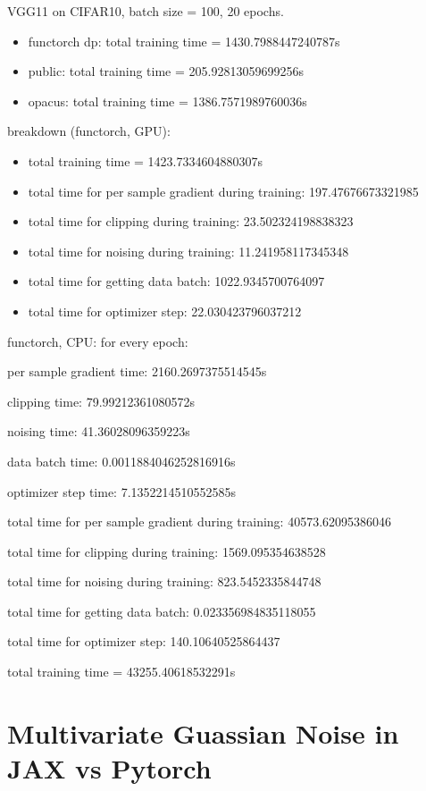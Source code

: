 \documentclass{article}
\theoremstyle{plain}
\begin{document}
VGG11 on CIFAR10, batch size = 100, 20 epochs.
\begin{itemize}
    \item functorch dp: total training time = 1430.7988447240787s
    \item public: total training time = 205.92813059699256s
    \item opacus: total training time = 1386.7571989760036s
\end{itemize}

breakdown (functorch, GPU):
\begin{itemize}
    \item total training time = 1423.7334604880307s
    \item total time for per sample gradient during training: 197.47676673321985
    \item total time for clipping during training: 23.502324198838323
    \item total time for noising during training: 11.241958117345348
    \item total time for getting data batch: 1022.9345700764097
    \item total time for optimizer step: 22.030423796037212
\end{itemize}

functorch, CPU:
for every epoch:

per sample gradient time: 2160.2697375514545s

clipping time: 79.99212361080572s

noising time: 41.36028096359223s

data batch time: 0.0011884046252816916s

optimizer step time: 7.1352214510552585s

total time for per sample gradient during training: 40573.62095386046

total time for clipping during training: 1569.095354638528

total time for noising during training: 823.5452335844748

total time for getting data batch: 0.023356984835118055

total time for optimizer step: 140.10640525864437

total training time = 43255.40618532291s


\section*{Multivariate Guassian Noise in JAX vs Pytorch}
\end{document}
